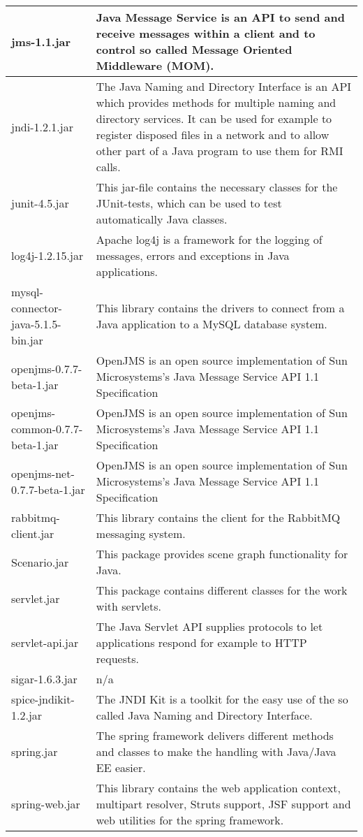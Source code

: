 \begin{center}
\begin{longtable}{|p{}|p{}|}
\hline 
jms-1.1.jar & Java Message Service is an API to send and receive messages within a client and to control so called Message Oriented Middleware (MOM).\\
\hline 
jndi-1.2.1.jar & The Java Naming and Directory Interface is an API which provides methods for multiple naming and directory services. It can be used for example to register disposed files in a network and to allow other part of a Java program to use them for RMI calls.\\
\hline 
junit-4.5.jar & This jar-file contains the necessary classes for the JUnit-tests, which can be used to test automatically Java classes.\\
\hline 
log4j-1.2.15.jar & Apache log4j is a framework for the logging of messages, errors and exceptions in Java applications.\\
\hline 
mysql-connector-java-5.1.5-bin.jar & This library contains the drivers to connect from a Java application to a MySQL database system.\\
\hline 
openjms-0.7.7-beta-1.jar & OpenJMS is an open source implementation of Sun Microsystems's Java Message Service API 1.1 Specification\\
\hline 
openjms-common-0.7.7-beta-1.jar & OpenJMS is an open source implementation of Sun Microsystems's Java Message Service API 1.1 Specification\\
\hline 
openjms-net-0.7.7-beta-1.jar & OpenJMS is an open source implementation of Sun Microsystems's Java Message Service API 1.1 Specification\\
\hline 
rabbitmq-client.jar & This library contains the client for the RabbitMQ messaging system.\\
\hline 
Scenario.jar & This package provides scene graph functionality for Java.\\
\hline 
servlet.jar & This package contains different classes for the work with servlets.\\
\hline 
servlet-api.jar & The Java Servlet API supplies protocols to let applications respond for example to HTTP requests.\\
\hline 
sigar-1.6.3.jar & n/a\\
\hline 
spice-jndikit-1.2.jar & The JNDI Kit is a toolkit for the easy use of the so called Java Naming and Directory Interface.\\
\hline 
spring.jar & The spring framework delivers different methods and classes to make the handling with Java/Java EE easier.\\
\hline 
spring-web.jar & This library contains the web application context, multipart resolver, Struts support, JSF support and web utilities for the spring framework.\\
\hline 
\end{longtable}
\label{tabular:libraries}
\end{center}
